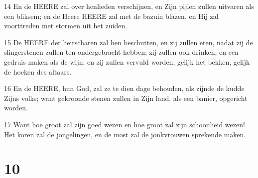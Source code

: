 \par 14 En de HEERE zal over henlieden verschijnen, en Zijn pijlen zullen uitvaren als een bliksem; en de Heere HEERE zal met de bazuin blazen, en Hij zal voorttreden met stormen uit het zuiden.
\par 15 De HEERE der heirscharen zal hen beschutten, en zij zullen eten, nadat zij de slingerstenen zullen ten ondergebracht hebben; zij zullen ook drinken, en een gedruis maken als de wijn; en zij zullen vervuld worden, gelijk het bekken, gelijk de hoeken des altaars.
\par 16 En de HEERE, hun God, zal ze te dien dage behouden, als zijnde de kudde Zijns volks; want gekroonde stenen zullen in Zijn land, als een banier, opgericht worden.
\par 17 Want hoe groot zal zijn goed wezen en hoe groot zal zijn schoonheid wezen! Het koren zal de jongelingen, en de most zal de jonkvrouwen sprekende maken.

\chapter{10}

